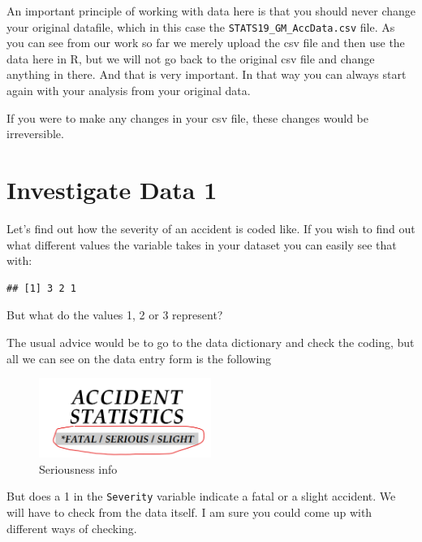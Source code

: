 \documentclass[
]{article}
\newenvironment{Shaded}{\begin{snugshade}}{\end{snugshade}}
\newcommand{\FunctionTok}[1]{\textcolor[rgb]{0.13,0.29,0.53}{\textbf{#1}}}
\newcommand{\NormalTok}[1]{#1}
\newcommand{\SpecialCharTok}[1]{\textcolor[rgb]{0.81,0.36,0.00}{\textbf{#1}}}
\begin{document}
An important principle of working with data here is that you should
never change your original datafile, which in this case the
\texttt{STATS19\_GM\_AccData.csv} file. As you can see from our work so
far we merely upload the csv file and then use the data here in R, but
we will not go back to the original csv file and change anything in
there. And that is very important. In that way you can always start
again with your analysis from your original data.

If you were to make any changes in your csv file, these changes would be
irreversible.

\hypertarget{investigate-data-1}{%
\section{Investigate Data 1}\label{investigate-data-1}}

Let's find out how the severity of an accident is coded like. If you
wish to find out what different values the variable takes in your
dataset you can easily see that with:

\begin{Shaded}
\end{Shaded}

\begin{verbatim}
## [1] 3 2 1
\end{verbatim}

But what do the values 1, 2 or 3 represent?

The usual advice would be to go to the data dictionary and check the
coding, but all we can see on the data entry form is the following

\begin{figure}
\centering
\includegraphics[width=0.5\textwidth,height=\textheight]{images/serious.png}
\caption{Seriousness info}
\end{figure}

But does a 1 in the \texttt{Severity} variable indicate a fatal or a
slight accident. We will have to check from the data itself. I am sure
you could come up with different ways of checking.
\end{document}
